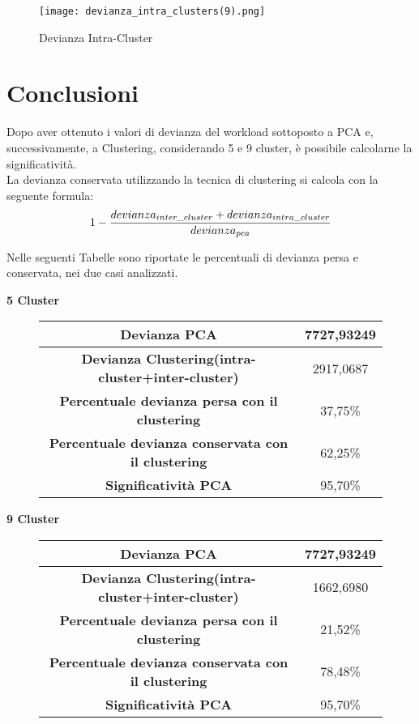 \begin{figure}[!htbp]
  \centering
	\texttt{[image: devianza\_intra\_clusters(9).png]}
  \caption{Devianza Intra-Cluster}
  \label{}
\end{figure}
\clearpage
\section{Conclusioni}

Dopo aver ottenuto i valori di devianza del workload sottoposto a PCA e, successivamente,
a Clustering, considerando 5 e 9 cluster, è possibile calcolarne la significatività.\\
La devianza conservata utilizzando la tecnica di clustering si calcola con la
seguente formula:
$$1-{devianza_{inter\_cluster}+devianza_{intra\_cluster}\over {devianza_{pca}}}$$

Nelle seguenti Tabelle sono riportate le percentuali di devianza persa e conservata,
 nei due casi analizzati.\\
\vspace{5 mm}

\begin{center}
  \textbf{5 Cluster}
\end{center}
\begin{figure}[!htbp]
  \centering
  \begin{tabular}{|c|c|}
  \hline
  \textbf{Devianza PCA}	& 7727,93249 \\
  \hline
  \textbf{Devianza Clustering(intra-cluster+inter-cluster)}	& 2917,0687 \\
  \hline
  \textbf{Percentuale devianza persa con il clustering}	& 37,75\% \\
  \hline
  \textbf{Percentuale devianza conservata con il clustering}	& 62,25\% \\
  \hline
  \textbf{Significatività PCA} &	95,70\% \\
  \hline
  \end{tabular}
\end{figure}


\vspace{5 mm}
\begin{center}
  \textbf{9 Cluster}
\end{center}
\begin{figure}[!htbp]
  \centering
  \begin{tabular}{|c|c|}
    \hline
    \textbf{Devianza PCA}	& 7727,93249 \\
    \hline
    \textbf{Devianza Clustering(intra-cluster+inter-cluster)}	& 1662,6980 \\
    \hline
    \textbf{Percentuale devianza persa con il clustering}	& 21,52\% \\
    \hline
    \textbf{Percentuale devianza conservata con il clustering}	& 78,48\% \\
    \hline
    \textbf{Significatività PCA} &	95,70\% \\
    \hline
  \end{tabular}
\end{figure}

